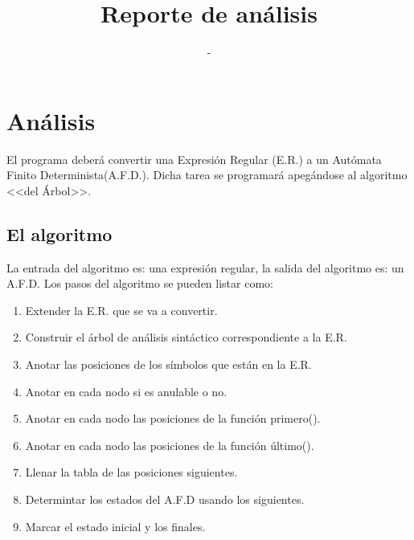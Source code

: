 \documentclass{book}
\title{Reporte de análisis}
\author{-}
\begin{document}
\maketitle

\chapter{Análisis}
El programa deberá convertir una Expresión Regular (E.R.) a un Autómata Finito Determinista(A.F.D.). 
Dicha tarea se programará apegándose al algoritmo <<del Árbol>>.


\section{El algoritmo}

La entrada del algoritmo es: una expresión regular, la salida del algoritmo es: un A.F.D.
Los pasos del algoritmo se pueden listar como:

\begin{enumerate}
\item Extender la E.R. que se va a convertir.
\item Construir el árbol de análisis sintáctico correspondiente a la E.R.
\item Anotar las posiciones de los símbolos que están en la E.R.
\item Anotar en cada nodo si es anulable o no.
\item Anotar en cada nodo las posiciones de la función primero().
\item Anotar en cada nodo las posiciones de la función último().
\item Llenar la tabla de las posiciones siguientes.
\item Determintar los estados del A.F.D usando los siguientes.
\item Marcar el estado inicial y los finales.
\end{enumerate}
\end{document}
